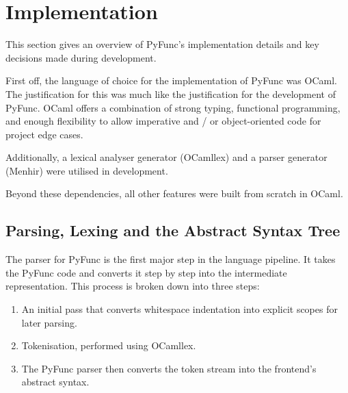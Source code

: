 \documentclass{l4proj}
\begin{document}
\chapter{Implementation}
\label{chp:implementation}

This section gives an overview of PyFunc's implementation details and key decisions made during development.

First off, the language of choice for the implementation of PyFunc was OCaml.
The justification for this was much like the justification for the development of PyFunc.
OCaml offers a combination of strong typing, functional programming, and enough flexibility to allow imperative and / or object-oriented code for project edge cases.
 
Additionally, a lexical analyser generator (OCamllex) and a parser generator (Menhir) were utilised in development.

Beyond these dependencies, all other features were built from scratch in OCaml.

\section{Parsing, Lexing and the Abstract Syntax Tree} \label{sec:parsing-lexing-and-the-ast}


The parser for PyFunc is the first major step in the language pipeline. It takes the PyFunc code and converts it step by step into the intermediate representation.
This process is broken down into three steps:
\begin{enumerate}
    \item An initial pass that converts whitespace indentation into explicit scopes for later parsing.
    \item Tokenisation, performed using OCamllex.
    \item The PyFunc parser then converts the token stream into the frontend's abstract syntax.
\end{enumerate}
\end{document}
